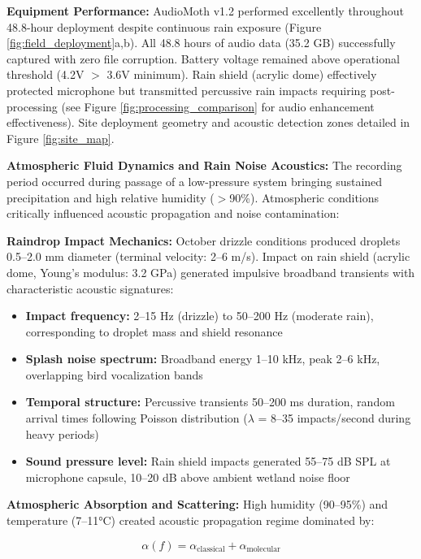 \documentclass[twocolumn]{article}
\begin{document}
\textbf{Equipment Performance:} AudioMoth v1.2 performed excellently throughout 48.8-hour deployment despite continuous rain exposure (Figure \ref{fig:field_deployment}a,b). All 48.8 hours of audio data (35.2 GB) successfully captured with zero file corruption. Battery voltage remained above operational threshold (4.2V $>$ 3.6V minimum). Rain shield (acrylic dome) effectively protected microphone but transmitted percussive rain impacts requiring post-processing (see Figure \ref{fig:processing_comparison} for audio enhancement effectiveness). Site deployment geometry and acoustic detection zones detailed in Figure \ref{fig:site_map}.

\textbf{Atmospheric Fluid Dynamics and Rain Noise Acoustics:} The recording period occurred during passage of a low-pressure system bringing sustained precipitation and high relative humidity ($>$90\%). Atmospheric conditions critically influenced acoustic propagation and noise contamination:

\textbf{Raindrop Impact Mechanics:} October drizzle conditions produced droplets 0.5--2.0 mm diameter (terminal velocity: 2--6 m/s). Impact on rain shield (acrylic dome, Young's modulus: 3.2 GPa) generated impulsive broadband transients with characteristic acoustic signatures:

\begin{itemize}
\item \textbf{Impact frequency:} 2--15 Hz (drizzle) to 50--200 Hz (moderate rain), corresponding to droplet mass and shield resonance
\item \textbf{Splash noise spectrum:} Broadband energy 1--10 kHz, peak 2--6 kHz, overlapping bird vocalization bands
\item \textbf{Temporal structure:} Percussive transients 50--200 ms duration, random arrival times following Poisson distribution ($\lambda$ = 8--35 impacts/second during heavy periods)
\item \textbf{Sound pressure level:} Rain shield impacts generated 55--75 dB SPL at microphone capsule, 10--20 dB above ambient wetland noise floor
\end{itemize}

\textbf{Atmospheric Absorption and Scattering:} High humidity (90--95\%) and temperature (7--11°C) created acoustic propagation regime dominated by:

\begin{equation}
\alpha(f) = \alpha_{\text{classical}} + \alpha_{\text{molecular}}
\end{equation}
\end{document}
